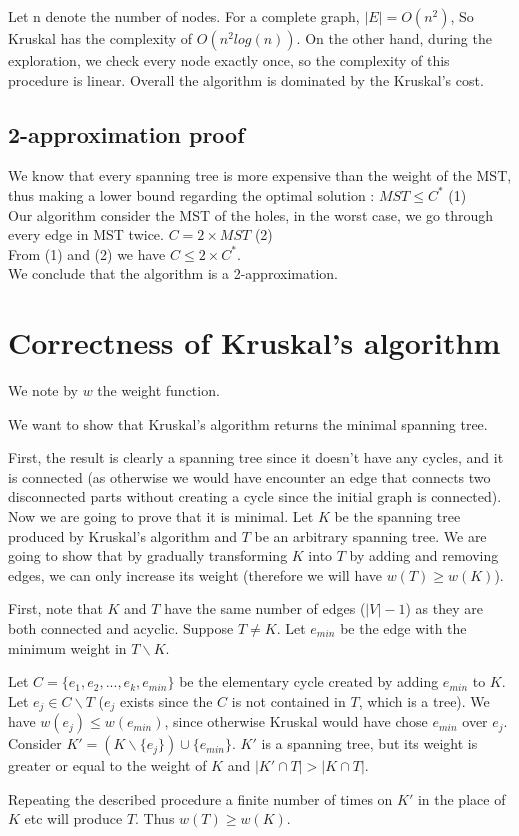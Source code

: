\documentclass{article}
\begin{document}
Let n denote the number of nodes. For a complete graph, $|E| = O(n^2)$, So Kruskal has the complexity of $O(n^2log(n))$. On the other hand, during the exploration, we check every node exactly once, so the complexity of this procedure is linear. Overall the algorithm is dominated by the Kruskal's cost. 

\subsection{2-approximation proof}
We know that every spanning tree is more expensive than the weight of the MST, thus making a lower bound regarding the optimal solution :
$MST \leq C^{*}$  (1)\\
Our algorithm consider the MST of the holes, in the worst case, we go through every edge in MST twice.
$C = 2 \times MST$  (2)\\ 
From (1) and (2) we have $C \leq 2 \times C^{*}$.\\
We conclude that the algorithm is a 2-approximation.

\section{Correctness of Kruskal's algorithm}

We note by $w$ the weight function.

We want to show that Kruskal's algorithm returns the minimal spanning tree.

First, the result is clearly a spanning tree since it doesn't have any cycles, and it is connected (as otherwise we would have encounter an edge that connects two disconnected parts without creating a cycle since the initial graph is connected). Now we are going to prove that it is minimal. 
Let $K$ be the spanning tree produced by Kruskal's algorithm and $T$ be an arbitrary spanning tree. 
We are going to show that by gradually transforming $K$ into $T$ by adding and removing edges, we can only increase its weight (therefore we will have $w(T)\geq w(K)$).

First, note that $K$ and $T$ have the same number of edges ($|V|-1$) as they are both connected and acyclic. Suppose $T\neq K$. Let $e_{min}$ be the edge with the minimum weight in $T\backslash K$. 

Let $C = \{e_1,e_2,...,e_k,e_{min}\}$ be the elementary cycle created by adding $e_{min}$ to $K$. Let $e_j \in C \backslash T$ ($e_j$ exists since the $C$ is not contained in $T$, which is a tree). We have $w(e_j)\leq w(e_{min})$, since otherwise Kruskal would have chose $e_{min}$ over $e_j$. Consider $K' = (K\backslash \{e_j\})\cup\{e_{min}\}$. $K'$ is a spanning tree, but its weight is greater or equal to the weight of $K$ and $|K'\cap T| > |K \cap T|$. 

Repeating the described procedure a finite number of times on $K'$ in the place of $K$ etc will produce $T$. Thus $w(T)\geq w(K)$.
\end{document}

